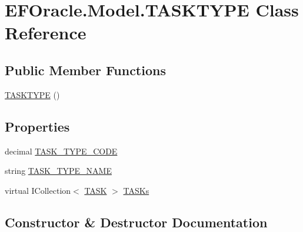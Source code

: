 \hypertarget{class_e_f_oracle_1_1_model_1_1_t_a_s_k_t_y_p_e}{}\section{E\+F\+Oracle.\+Model.\+T\+A\+S\+K\+T\+Y\+PE Class Reference}
\label{class_e_f_oracle_1_1_model_1_1_t_a_s_k_t_y_p_e}
\subsection*{Public Member Functions}
\begin{DoxyCompactItemize}
\item 
\hyperlink{class_e_f_oracle_1_1_model_1_1_t_a_s_k_t_y_p_e_a7f48654598b04b495860c5451fcf8952}{T\+A\+S\+K\+T\+Y\+PE} ()
\end{DoxyCompactItemize}
\subsection*{Properties}
\begin{DoxyCompactItemize}
\item 
decimal \hyperlink{class_e_f_oracle_1_1_model_1_1_t_a_s_k_t_y_p_e_a877afe21313ad7d238a82c0bb5eb32e3}{T\+A\+S\+K\+\_\+\+T\+Y\+P\+E\+\_\+\+C\+O\+DE}
\item 
string \hyperlink{class_e_f_oracle_1_1_model_1_1_t_a_s_k_t_y_p_e_a6db2d56a8de10797e383dabddf2fb044}{T\+A\+S\+K\+\_\+\+T\+Y\+P\+E\+\_\+\+N\+A\+ME}
\item 
virtual I\+Collection$<$ \hyperlink{class_e_f_oracle_1_1_model_1_1_t_a_s_k}{T\+A\+SK} $>$ \hyperlink{class_e_f_oracle_1_1_model_1_1_t_a_s_k_t_y_p_e_ae608b740cf60d199acb2940b9c5e859d}{T\+A\+S\+Ks}
\end{DoxyCompactItemize}


\subsection{Constructor \& Destructor Documentation}
\mbox{\label{class_e_f_oracle_1_1_model_1_1_t_a_s_k_t_y_p_e_a7f48654598b04b495860c5451fcf8952}} 
